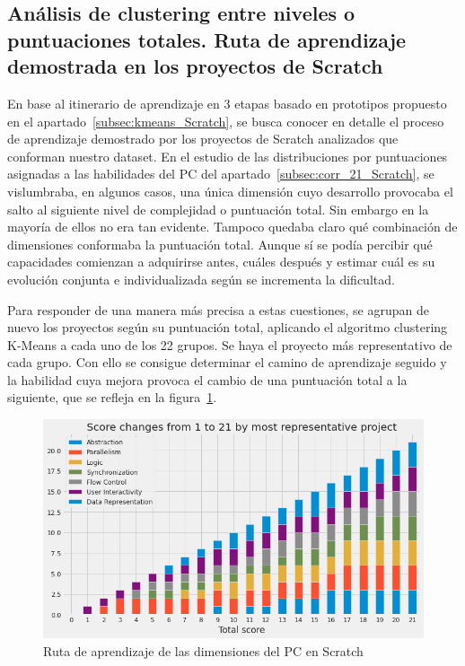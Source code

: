 \documentclass[a4paper, 12pt]{book}
\begin{document}
\subsection{Análisis de clustering entre niveles o puntuaciones totales. Ruta de aprendizaje demostrada en los proyectos de Scratch}
\label{subsec:ruta_Scratch}

En base al itinerario de aprendizaje en 3 etapas basado en prototipos propuesto en el apartado~\ref{subsec:kmeans_Scratch}, se  busca conocer en detalle el proceso de aprendizaje demostrado por los proyectos de Scratch analizados que conforman nuestro dataset. 
En el estudio de las distribuciones por puntuaciones asignadas a las habilidades del PC del apartado~\ref{subsec:corr_21_Scratch}, se vislumbraba, en algunos casos, una única dimensión cuyo desarrollo provocaba el salto al siguiente nivel de complejidad o puntuación total. Sin embargo en la mayoría de ellos no era tan evidente. Tampoco quedaba claro qué combinación de dimensiones conformaba la puntuación total. 
Aunque sí se podía percibir qué capacidades comienzan a adquirirse antes, cuáles después y estimar cuál es su evolución conjunta e individualizada según se incrementa la dificultad.

Para responder de una manera más precisa a estas cuestiones, se agrupan de nuevo los proyectos según su puntuación total, aplicando el algoritmo clustering K-Means a cada uno de los 22 grupos. Se haya el proyecto más representativo de cada grupo. 
Con ello se consigue determinar el camino de aprendizaje seguido y la habilidad cuya mejora provoca el cambio de una puntuación total a la siguiente, que se refleja en la figura~\ref{fig:path_Scratch}.


\begin{figure}[H]
    \centering
    \includegraphics[width=1\textwidth]{img/path_CT_Scratch1.png}
    \caption{Ruta de aprendizaje de las dimensiones del PC en Scratch}\label{fig:path_Scratch}
\end{figure}
\end{document}
